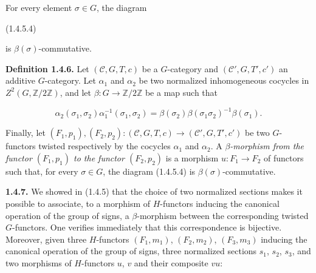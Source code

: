 %
For every element $\sigma\in G$, the diagram

\begin{center}
  \hfill\textup{(1.4.5.4)}
\end{center}
is $\beta(\sigma)$-commutative.

\noindent\textbf{Definition 1.4.6.}\quad
Let $(\mathcal C,G,T,c)$ be a $G$-category and
$(\mathcal C',G,T',c')$ an additive $G$-category. Let $\alpha_1$ and
$\alpha_2$ be two normalized inhomogeneous cocycles in
$Z^2(G,\mathbb Z/2\mathbb Z)$, and let
$\beta\colon G\to\mathbb Z/2\mathbb Z$ be a map such that

\begin{equation}
  \alpha_2(\sigma_1,\sigma_2)\alpha_1^{-1}(\sigma_1,\sigma_2)
  =\beta(\sigma_2)\beta(\sigma_1\sigma_2)^{-1}\beta(\sigma_1).
  \tag{1.4.6.1}
\end{equation}

Finally, let
$(F_1,p_1),(F_2,p_2)\colon(\mathcal C,G,T,c)
\to(\mathcal C',G,T',c')$ be two $G$-functors twisted respectively
by the cocycles $\alpha_1$ and $\alpha_2$. A
\emph{$\beta$-morphism from the functor $(F_1,p_1)$ to the functor
$(F_2,p_2)$} is a morphism $u\colon F_1\to F_2$ of functors such that,
for every $\sigma\in G$, the diagram (1.4.5.4) is
$\beta(\sigma)$-commutative.

\noindent\textbf{1.4.7.}\quad
We showed in (1.4.5) that the choice of two normalized sections makes
it possible to associate, to a morphism of $H$-functors inducing the
canonical operation of the group of signs, a $\beta$-morphism between
the corresponding twisted $G$-functors. One verifies immediately that
this correspondence is bijective. Moreover, given three $H$-functors
$(F_1,m_1)$, $(F_2,m_2)$, $(F_3,m_3)$ inducing the canonical operation
of the group of signs, three normalized sections $s_1$, $s_2$, $s_3$,
and two morphisms of $H$-functors $u$, $v$ and their composite $vu$:

